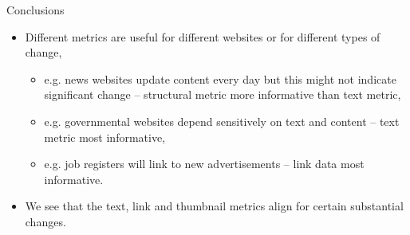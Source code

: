 \documentclass[10pt]{beamer}
\begin{document}
\begin{frame}{Conclusions}
\begin{itemize}
\item Different metrics are useful for different websites or for different types of change,
\begin{itemize}
\item e.g. news websites update content every day but this might not indicate significant change -- structural metric more informative than text metric,
\item e.g. governmental websites depend sensitively on text and content -- text metric most informative,
\item e.g. job registers will link to new advertisements -- link data most informative.
\end{itemize}
\vspace{2ex}
\item We see that the text, link and thumbnail metrics align for certain substantial changes.
\end{itemize}
\end{frame}
\end{document}
